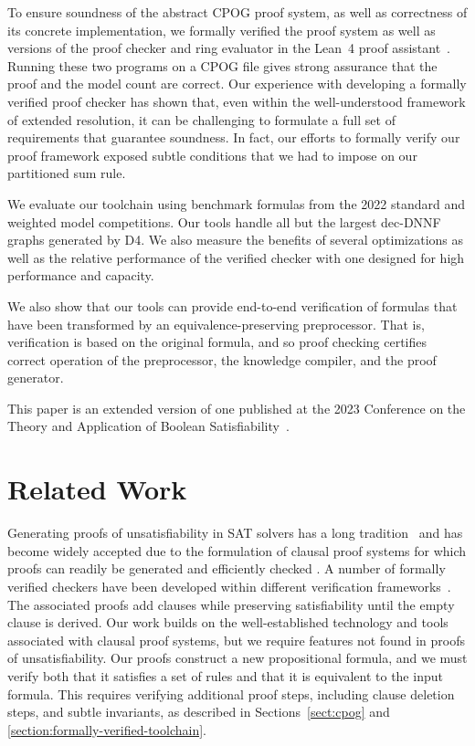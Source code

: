 \documentclass[twoside,11pt]{article}
\newcommand{\progname}[1]{\textsc{#1}}
\newcommand{\dfour}{\progname{D4}}
\newcommand{\lean}{Lean~4}
\begin{document}
To ensure soundness of the abstract CPOG proof system, as well as
correctness of its concrete implementation, we formally verified the
proof system as well as versions of the proof checker and ring
evaluator in the \lean{} proof assistant~\cite{demoura:cade:2021}.
Running these two programs on a  CPOG file gives strong
assurance that the proof and the model count are correct. Our
experience with developing a formally verified proof checker has shown
that, even within the well-understood framework of extended
resolution, it can be challenging to formulate a full set of
requirements that guarantee soundness.  In fact, our efforts to
formally verify our proof framework exposed subtle conditions that we had
to impose on our partitioned sum rule.

We evaluate our toolchain using benchmark formulas from the 2022
standard and weighted model competitions.  Our tools handle all but
the largest dec-DNNF graphs generated by \dfour{}.  We also measure
the benefits of several optimizations as well as the relative
performance of the verified checker with one designed for high
performance and capacity.

We also show that our tools can provide end-to-end verification of
formulas that have been transformed by an equivalence-preserving
preprocessor.  That is, verification is based on the original formula,
and so proof checking certifies correct operation of the preprocessor,
the knowledge compiler, and the proof generator.

This paper is an extended version of one published at the
2023 Conference on the Theory and Application of Boolean Satisfiability~\cite{bryant:sat:2023}.

\section{Related Work}


Generating proofs of unsatisfiability in SAT solvers has a long
tradition~\cite{ZhangMalik} and has become widely accepted due to the
formulation of clausal proof systems for which proofs can readily be
generated and efficiently checked
\cite{heule:cade:2013,wetzler14_drattrim}.
A number of formally verified checkers have been developed within different verification frameworks~\cite{cruz-cade-2017,lrat,Lammich:20,Tan:2021}.
The associated proofs add clauses while preserving satisfiability until the empty clause is derived.
Our work builds on the well-established technology and tools associated with clausal proof systems,
but we require features not found in proofs of unsatisfiability.
Our proofs construct a new propositional formula, and we must verify
both
that it
satisfies a set of rules and that it
is equivalent to the input formula.  This requires verifying
additional proof steps, including clause deletion steps, and subtle
invariants, as described in Sections~\ref{sect:cpog} and
\ref{section:formally-verified-toolchain}.
\end{document}
